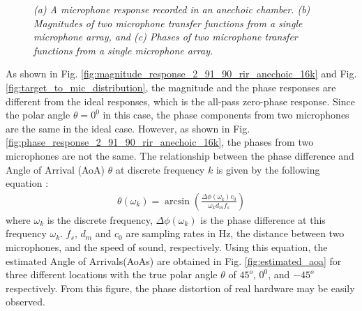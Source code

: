 \documentclass[a4paper]{article}
\begin{document}
\begin{figure}
  \begin{center}
  \caption {\label{fig:microphone_responses} \emph{ 
    (a) A microphone response recorded in an anechoic chamber.
    (b) Magnitudes of two microphone transfer functions from a single microphone array,
    and (c) Phases of two microphone transfer functions from a single microphone array.}}
  \end{center}
\end{figure}
%
%
%
As shown in Fig. \ref{fig:magnitude_response_2_91_90_rir_anechoic_16k}
and Fig. \ref{fig:target_to_mic_distribution}, the magnitude and the phase
responses are different from the ideal responses, which is the all-pass
zero-phase response. Since the polar angle $\theta=0^{0}$ in this case,
the phase components from two microphones are the same in the ideal case.
However, as shown in Fig. \ref{fig:phase_response_2_91_90_rir_anechoic_16k},
the phases from two microphones are not the same.
%
The relationship between the phase difference and Angle of Arrival (AoA) $\theta$
at discrete frequency $k$ is given by the following equation
\cite{C_Kim_INTERSPEECH_2015, C_Kim_ICASSP_2012_2}:
\begin{align}
  \theta(\omega_k) = \arcsin \left( \frac{\Delta \phi (\omega_k) c_0}{\omega_k d_m f_s}  \right)
\end{align}
where $\omega_k$ is the discrete frequency, $\Delta \phi (\omega_k)$ is the
phase difference at this frequency $\omega_k$. $f_s$, $d_m$ and $c_0$ are
sampling rates in Hz, the distance between two microphones, and
the speed of sound, respectively. Using this equation, the estimated
Angle of Arrivals(AoAs) are obtained in Fig. \ref{fig:estimated_aoa}
for three different locations with
the true polar angle $\theta$ of $45^{o}$, $0^{0}$, and $-45^{o}$ respectively.
From this figure, the phase distortion of real hardware may be easily observed.
\end{document}

